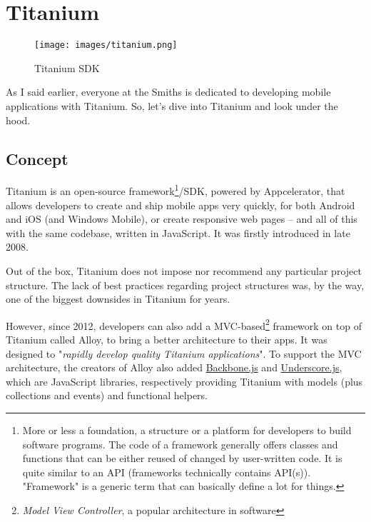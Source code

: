 \section{Titanium}

\begin{figure}[!h]
   \centering\texttt{[image: images/titanium.png]}
   \caption{Titanium SDK}
\end{figure}

As I said earlier, everyone at the Smiths is dedicated to developing mobile applications with Titanium. So, let's dive into Titanium and look under the hood.

\subsection{Concept}

Titanium is an open-source framework\footnote{More or less a foundation, a structure or a platform for developers to build software programs. The code of a framework generally offers classes and functions that can be either reused of changed by user-written code. It is quite similar to an API (frameworks technically contains API(s)). "Framework" is a generic term that can basically define a lot for things.}/SDK, powered by Appcelerator, that allows developers to create and ship mobile apps very quickly, for both Android and iOS (and Windows Mobile), or create responsive web pages -- and all of this with the same codebase, written in JavaScript. It was firstly introduced in late 2008.

\medskip

Out of the box, Titanium does not impose nor recommend any particular project structure. The lack of best practices regarding project structures was, by the way, one of the biggest downsides in Titanium for years.

\medskip

However, since 2012, developers can also add a MVC-based\footnote{\textit{Model View Controller}, a popular architecture in software} framework on top of Titanium called Alloy, to bring a better architecture to their apps. It was designed to "\textit{rapidly develop quality Titanium applications}". To support the MVC architecture, the creators of Alloy also added \href{http://backbonejs.org/}{Backbone.js} and \href{http://underscorejs.org/}{Underscore.js}, which are JavaScript libraries, respectively providing Titanium with models (plus collections and events) and functional helpers.

